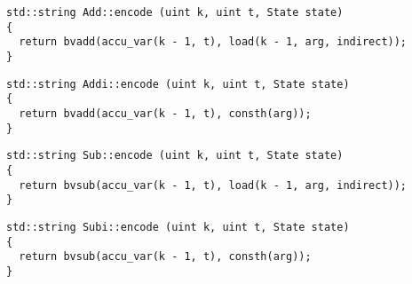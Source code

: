 
\begin{lstlisting}[style=c++]
std::string Add::encode (uint k, uint t, State state)
{
  return bvadd(accu_var(k - 1, t), load(k - 1, arg, indirect));
}
\end{lstlisting}


\begin{lstlisting}[style=c++]
std::string Addi::encode (uint k, uint t, State state)
{
  return bvadd(accu_var(k - 1, t), consth(arg));
}
\end{lstlisting}


\begin{lstlisting}[style=c++]
std::string Sub::encode (uint k, uint t, State state)
{
  return bvsub(accu_var(k - 1, t), load(k - 1, arg, indirect));
}
\end{lstlisting}


\begin{lstlisting}[style=c++]
std::string Subi::encode (uint k, uint t, State state)
{
  return bvsub(accu_var(k - 1, t), consth(arg));
}
\end{lstlisting}


